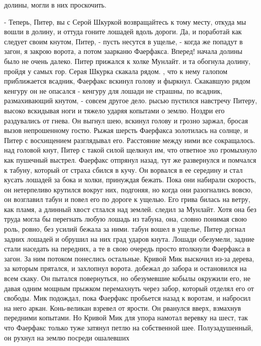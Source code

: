 долины, могли в них проскочить.
\par- Теперь, Питер, вы с Серой Шкуркой возвращайтесь к тому месту, 
откуда мы вошли в долину, и оттуда гоните лошадей вдоль дороги. Да, и 
поработай как следует своим кнутом, Питер, - пусть несутся в ущелье, - 
когда же попадут в загон, я закрою ворота, а потом заарканю Фаерфакса. 
Вперед!
 начала долины было не очень далеко. Питер прижался к холке 
Мунлайт. и та обогнула долину, пройдя у самых гор. Серая Шкурка 
скакала рядом.
, что к нему галопом приближается всадник, Фаерфакс вскинул 
голову и фыркнул. Скакавшую рядом кенгуру он не опасался - кенгуру для 
лошади не страшны, по всадник, размахивающий кнутом, - совсем другое 
дело.
 рысью пустился навстречу Питеру, высоко вскидывая ноги и тяжело 
ударяя копытами о землю. Ноздри его раздувались от гнева. Он выгнул 
шею, вскинул голову и грозно заржал, бросая вызов непрошенному гостю. 
Рыжая шерсть Фаерфакса золотилась на солнце, и Питер с восхищением 
разглядывал его. Расстояние между ними все сокращалось.
 над головой кнут, Питер с такой силой щелкнул им, что 
ответное эхо громыхнуло как пушечный выстрел. Фаерфакс отпрянул назад, 
тут же развернулся и помчался к табуну, который от страха сбился в 
кучу. Он ворвался в ее середину и стал кусать лошадей за бока и холки, 
принуждая бежать. Пока они набирали скорость, он нетерпеливо крутился 
вокруг них, подгоняя, но когда они разогнались вовсю, он возглавил 
табун и повел его по дороге к ущелью. Его грива билась на ветру, как 
пламя, а длинный хвост стлался над землей.
 следил за Мунлайт. Хотя она без труда могла бы перегнать 
любую лошадь из табуна, она, словно понимая свою роль, ровно, без 
усилий бежала за ними.
 табун вошел в ущелье, Питер догнал задних лошадей и обрушил 
на них град ударов кнута. Лошади обезумели, задние стали наседать на 
передних, а те в свою очередь просто втолкнули Фаерфакса в загон. За 
ним потоком понеслись остальные. Кривой Мик выскочил из-за дерева, за 
которым прятался, и захлопнул ворота.
 добежал до забора и остановился на всем скаку. Он пытался 
повернуться, но обезумевшие кобылы окружили его, не давая одним мощным 
прыжком перемахнуть через забор, который отделял его от свободы.
 Мик подождал, пока Фаерфакс пробьется назад к воротам, и 
набросил на него аркан. Конь-великан взревел от ярости. Он рванулся 
вверх, взмахнув передними копытами. Но Кривой Мик для упора намотал 
веревку на шест, так что Фаерфакс только туже затянул петлю на 
собственной шее. Полузадушенный, он рухнул на землю посреди ошалевших 
